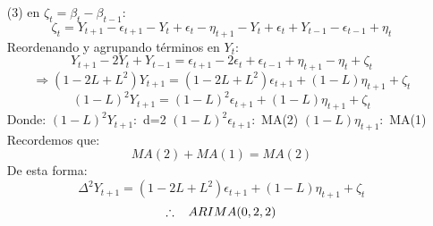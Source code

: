 \documentclass[12pt,letterpaper]{article}
\begin{document}
\begin{itemize}
\begin{itemize}
        \item[(3)] en $\zeta_t = \beta_t-\beta_{t-1}$:
        \begin{equation*}
            \zeta_t = Y_{t+1}-\epsilon_{t+1} - Y_t + \epsilon_t-\eta_{t+1}-Y_t+\epsilon_t+Y_{t-1}-\epsilon_{t-1}+\eta_t
        \end{equation*}
        Reordenando y agrupando términos en $Y_t$:
        \begin{equation*}
            Y_{t+1}-2Y_t+Y_{t-1} = \epsilon_{t+1}-2\epsilon_t+\epsilon_{t-1}+\eta_{t+1}-\eta_t+\zeta_t
        \end{equation*}
        \begin{equation*}
            \Rightarrow (1-2L+L^2)Y_{t+1} = (1-2L+L^2)\epsilon_{t+1}+(1-L)\eta_{t+1}+\zeta_t
        \end{equation*}
        \begin{equation*}
            (1-L)^2Y_{t+1} = (1-L)^2\epsilon_{t+1}+(1-L)\eta_{t+1}+\zeta_t
        \end{equation*}
        Donde:
        \newline
        $(1-L)^2Y_{t+1}:$ d=2
        \newline
        $(1-L)^2\epsilon_{t+1}:$ MA(2)
        \newline
        $(1-L)\eta_{t+1}:$ MA(1)
        Recordemos que:
        \begin{equation*}
            MA(2) + MA(1) = MA(2)
        \end{equation*}
        De esta forma:
        \begin{equation*}
            \Delta^2Y_{t+1} = (1-2L+L^2)\epsilon_{t+1}+(1-L)\eta_{t+1}+\zeta_t
        \end{equation*}
        \begin{equation*}
            \therefore \hspace{3mm} ARIMA(0,2,2)
        \end{equation*}
    \end{itemize}
\end{itemize}   
    
\end{document}
